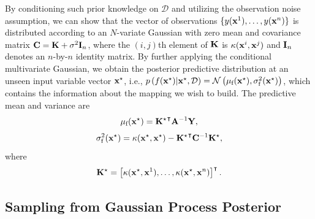 \documentclass{article}
\begin{document}
By conditioning such prior knowledge on $\mathcal{D}$ and utilizing the observation noise assumption, we can show that the vector of observations $\{y({\bf x}^1),\dots,y({\bf x}^n)\}$ is distributed according to an $N$-variate Gaussian with zero mean and covariance matrix ${\bf C} = {\bf K} + \sigma^2 {\bf I}_n$, where the $(i,j)$th element of ${\bf K}$ is $\kappa({\bf x}^i,{\bf x}^j)$ and ${\bf I}_n$ denotes an $n$-by-$n$ identity matrix.
By further applying the conditional multivariate Gaussian, we obtain the posterior predictive distribution at an unseen input variable vector ${\bf x}^\star$, i.e., $p\left(f({\bf x}^\star)|{\bf x}^\star,\mathcal{D}\right) = \mathcal{N}\left(\mu_\text{f}({\bf x}^\star),\sigma_\text{f}^2({\bf x}^\star)\right)$, which contains the information about the mapping we wish to build. The predictive mean and variance are 
% 
\begin{equation}\label{eqn2}
	\mu_\text{f}({\bf x}^\star)= {\bf K^\star}^\intercal {\bf A}^{-1} {\bf Y},
\end{equation}
% 
\begin{equation}\label{eqn3}
	\sigma_\text{f}^2({\bf x}^\star)=\kappa({\bf x}^\star,{\bf x}^\star)
	-{\bf K^\star}^\intercal {\bf C}^{-1} {\bf K^\star},
\end{equation}
where
% 
\begin{equation}\label{eqn4}
	{\bf K^\star} = \left[\kappa({\bf x}^\star,{\bf x}^1),\dots,\kappa({\bf x}^\star,{\bf x}^n)\right]^\intercal.
\end{equation}

\subsection{Sampling from Gaussian Process Posterior}
\end{document}
